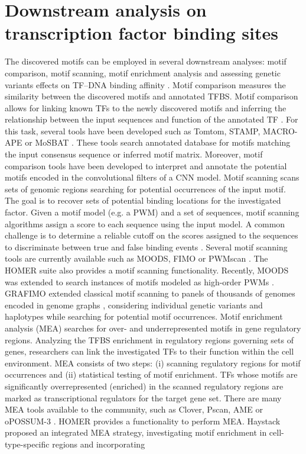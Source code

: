 \documentclass[a4paper, titlepage, openright]{book}
\newcommand{\grafimo}{GRAFIMO\xspace}
\begin{document}
\section{Downstream analysis on transcription factor binding sites}
The discovered motifs can be employed in several downstream analyses: motif comparison, motif scanning, motif enrichment analysis and assessing genetic variants effects on TF–DNA binding affinity \citep{tognon2023survey}. Motif comparison measures the similarity between the discovered motifs and annotated TFBS. Motif comparison allows for linking known TFs to the newly discovered motifs \citep{gupta2007quantifying} and inferring the relationship between the input sequences and function of the annotated TF \citep{weirauch2014determination}. For this task, several tools have been developed such as Tomtom, STAMP, MACRO-APE or MoSBAT \citep{gupta2007quantifying, mahony2007stamp, vorontsov2013jaccard, lambert2016motif}. These tools search annotated database for motifs matching the input consensus sequence or inferred motif matrix. Moreover, motif comparison tools have been developed to interpret and annotate the potential motifs encoded in the convolutional filters of a CNN model. Motif scanning scans sets of genomic regions searching for potential occurrences of the input motif. The goal is to recover sets of potential binding locations for the investigated factor. Given a motif model (e.g. a PWM) and a set of sequences, motif scanning algorithms assign a score to each sequence using the input model. A common challenge is to determine a reliable cutoff on the scores assigned to the sequences to discriminate between true and false binding events \citep{boeva2016analysis}. Several motif scanning tools are currently available such as MOODS, FIMO or PWMscan \citep{korhonen2009moods, grant2011fimo, ambrosini2018pwmscan}. The HOMER suite \citep{heinz2010simple} also provides a motif scanning functionality. Recently, MOODS was extended to search instances of motifs modeled as high-order PWMs \citep{korhonen2017fast}. \grafimo \citep{tognon2021grafimo} extended classical motif scanning to panels of thousands of genomes encoded in genome graphs \citep{paten2017genome}, considering individual genetic variants and haplotypes while searching for potential motif occurrences. Motif enrichment analysis (MEA) searches for over- and underrepresented motifs in gene regulatory regions. Analyzing the TFBS enrichment in regulatory regions governing sets of genes, researchers can link the investigated TFs to their function within the cell environment. MEA consists of two steps: (i) scanning regulatory regions for motif occurrences and (ii) statistical testing of motif enrichment. TFs whose motifs are significantly overrepresented (enriched) in the scanned regulatory regions are marked as transcriptional regulators for the target gene set. There are many MEA tools available to the community, such as Clover, Pscan, AME or oPOSSUM-3 \citep{frith2004detection, zambelli2009pscan, mcleay2010motif, kwon2012opossum}. HOMER \citep{heinz2010simple} provides a functionality to perform MEA. Haystack \citep{pinello2018haystack} proposed an integrated MEA strategy, investigating motif enrichment in cell-type-specific regions and incorporating 
\end{document}
